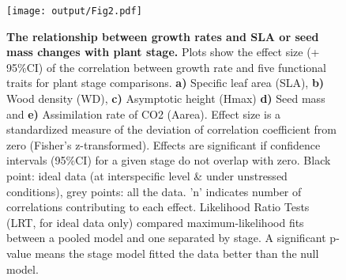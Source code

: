 \documentclass[a4paper]{article}\usepackage[]{graphicx}\usepackage[]{color}
\begin{document}
\begin{figure}[htbp]
\centering
\texttt{[image: output/Fig2.pdf]}
\caption{\textbf{The relationship between growth rates and SLA or seed mass changes with plant stage.} Plots show the effect size (+ 95\%CI) of the correlation between growth rate and five functional traits for plant stage comparisons. \textbf{a)} Specific leaf area (SLA), \textbf{b)} Wood density (WD), \textbf{c)} Asymptotic height (Hmax) \textbf{d)} Seed mass and \textbf{e)} Assimilation rate of CO2 (Aarea). Effect size is a standardized measure of the deviation of correlation coefficient from zero (Fisher's z-transformed). Effects are significant if confidence intervals (95\%CI) for a given stage do not overlap with zero. Black point: ideal data (at interspecific level \& under unstressed conditions), grey points: all the data. 'n' indicates number of correlations contributing to each effect. Likelihood Ratio Tests (LRT, for ideal data only) compared maximum-likelihood fits between a pooled model and one separated by stage. A significant p-value means the stage model fitted the data better than the null model.
}
\label{Fig2}



\end{figure}

\newpage
\end{document}
